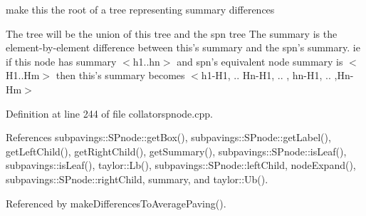 make this the root of a tree representing summary differences 

\-The tree will be the union of this tree and the spn tree \-The summary is the element-\/by-\/element difference between this's summary and the spn's summary. ie if this node has summary $<$h1..hn$>$ and spn's equivalent node summary is $<$\-H1..\-Hm$>$ then this's summary becomes $<$h1-\/\-H1, .. \-Hn-\/\-H1, .. , hn-\/\-H1, .. ,\-Hn-\/\-Hm$>$ 

\-Definition at line 244 of file collatorspnode.\-cpp.



\-References subpavings\-::\-S\-Pnode\-::get\-Box(), subpavings\-::\-S\-Pnode\-::get\-Label(), get\-Left\-Child(), get\-Right\-Child(), get\-Summary(), subpavings\-::\-S\-Pnode\-::is\-Leaf(), subpavings\-::is\-Leaf(), taylor\-::\-Lb(), subpavings\-::\-S\-Pnode\-::left\-Child, node\-Expand(), subpavings\-::\-S\-Pnode\-::right\-Child, summary, and taylor\-::\-Ub().



\-Referenced by make\-Differences\-To\-Average\-Paving().


